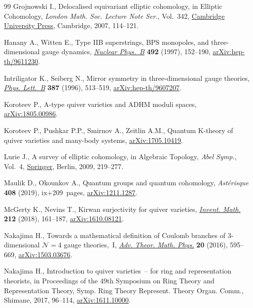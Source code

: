 \begin{thebibliography}{99}
Grojnowski I., Delocalised equivariant elliptic cohomology, in Elliptic
 Cohomology, \textit{London Math. Soc. Lecture Note Ser.}, Vol.~342, \href{https://doi.org/10.1017/CBO9780511721489.007}{Cambridge
 University Press}, Cambridge, 2007, 114--121.

Hanany A., Witten E., Type {IIB} superstrings, {BPS} monopoles, and
 three-dimensional gauge dynamics, \href{https://doi.org/10.1016/S0550-3213(97)00157-0}{\textit{Nuclear Phys.~B}} \textbf{492}
 (1997), 152--190, \href{https://arxiv.org/abs/hep-th/9611230}{arXiv:hep-th/9611230}.

Intriligator K., Seiberg N., Mirror symmetry in three-dimensional gauge
 theories, \href{https://doi.org/10.1016/0370-2693(96)01088-X}{\textit{Phys. Lett.~B}} \textbf{387} (1996), 513--519,
 \href{https://arxiv.org/abs/hep-th/9607207}{arXiv:hep-th/9607207}.

Koroteev P., A-type quiver varieties and ADHM moduli spaces,
 \href{https://arxiv.org/abs/1805.00986}{arXiv:1805.00986}.

Koroteev P., Pushkar P.P., Smirnov A., Zeitlin A.M., Quantum K-theory of quiver
 varieties and many-body systems, \href{https://arxiv.org/abs/1705.10419}{arXiv:1705.10419}.

Lurie J., A survey of elliptic cohomology, in Algebraic Topology, \textit{Abel
 Symp.}, Vol.~4, \href{https://doi.org/10.1007/978-3-642-01200-6_9}{Springer}, Berlin, 2009, 219--277.

Maulik D., Okounkov A., Quantum groups and quantum cohomology,
 \textit{Ast\'{e}risque} \textbf{408} (2019), ix+209~pages, \href{https://arxiv.org/abs/1211.1287}{arXiv:1211.1287}.

McGerty K., Nevins T., Kirwan surjectivity for quiver varieties,
 \href{https://doi.org/10.1007/s00222-017-0765-x}{\textit{Invent. Math.}} \textbf{212} (2018), 161--187, \href{https://arxiv.org/abs/1610.08121}{arXiv:1610.08121}.

Nakajima H., Towards a mathematical definition of {C}oulomb branches of
 3-dimensional {${\mathcal N}=4$} gauge theories,~{I}, \href{https://doi.org/10.4310/ATMP.2016.v20.n3.a4}{\textit{Adv. Theor.
 Math. Phys.}} \textbf{20} (2016), 595--669, \href{https://arxiv.org/abs/1503.03676}{arXiv:1503.03676}.

Nakajima H., Introduction to quiver varieties~-- for ring and representation
 theorists, in Proceedings of the 49th {S}ymposium on {R}ing {T}heory and
 {R}epresentation {T}heory, Symp. Ring Theory Represent. Theory Organ. Comm.,
 Shimane, 2017, 96--114, \href{https://arxiv.org/abs/1611.10000}{arXiv:1611.10000}.


\end{thebibliography}
